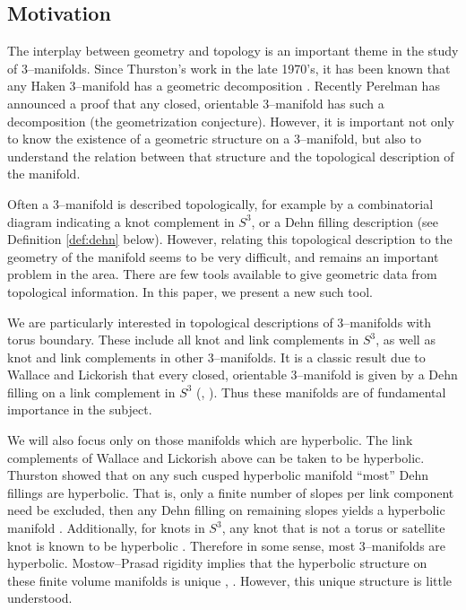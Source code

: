
\subsection{Motivation}


The interplay between geometry and topology is an important theme in
the study of 3--manifolds.  Since Thurston's work in the late 1970's,
it has been known that any Haken 3--manifold has a geometric
decomposition \cite{thurston}.  Recently Perelman has announced a
proof that any closed, orientable 3--manifold has such a decomposition
(the geometrization conjecture).  However, it is important not only to
know the existence of a geometric structure on a 3--manifold, but also
to understand the relation between that structure and the topological
description of the manifold.

Often a 3--manifold is described topologically, for example by a
combinatorial diagram indicating a knot complement in $S^3$, or a Dehn
filling description (see Definition \ref{def:dehn} below).  However,
relating this topological description to the geometry of the manifold
seems to be very difficult, and remains an important problem in the
area.  There are few tools available to give geometric data from
topological information.  In this paper, we present a new such tool.

We are particularly interested in topological descriptions of
3--manifolds with torus boundary.  These include all knot and link
complements in $S^3$, as well as knot and link complements in other
3--manifolds.  It is a classic result due to Wallace and Lickorish
that every closed, orientable 3--manifold is given by a Dehn filling
on a link complement in $S^3$ (\cite{wallace}, \cite{lickorish}).
Thus these manifolds are of fundamental importance in the subject.

We will also focus only on those manifolds which are hyperbolic.  The
link complements of Wallace and Lickorish above can be taken to be
hyperbolic.  Thurston showed that on any such cusped hyperbolic
manifold ``most'' Dehn fillings are hyperbolic.  That is, only a
finite number of slopes per link component need be excluded, then any
Dehn filling on remaining slopes yields a hyperbolic manifold
\cite{thurston}.  Additionally, for knots in $S^3$, any knot that is
not a torus or satellite knot is known to be hyperbolic
\cite{thurston:bulletin}.  Therefore in some sense, most 3--manifolds
are hyperbolic.  Mostow--Prasad rigidity implies that the hyperbolic
structure on these finite volume manifolds is unique \cite{mostow},
\cite{prasad}.  However, this unique structure is little understood.

